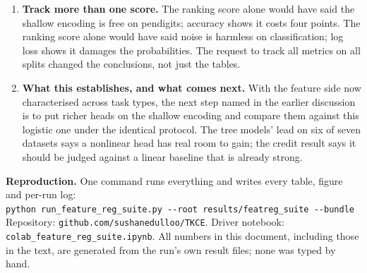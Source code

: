 \documentclass[11pt,a4paper]{article}
\begin{document}
\begin{enumerate}
\item \textbf{Track more than one score.} The ranking score alone would have
said the shallow encoding is free on pendigits; accuracy shows it costs four
points. The ranking score alone would have said noise is harmless on
classification; log loss shows it damages the probabilities. The request to
track all metrics on all splits changed the conclusions, not just the tables.

\item \textbf{What this establishes, and what comes next.} With the feature
side now characterised across task types, the next step named in the earlier
discussion is to put richer heads on the shallow encoding and compare them
against this logistic one under the identical protocol. The tree models' lead
on six of seven datasets says a nonlinear head has real room to gain; the
credit result says it should be judged against a linear baseline that is
already strong.

\end{enumerate}

\vfill
\begin{flushleft}\footnotesize
\textbf{Reproduction.} One command runs everything and writes every table,
figure and per-run log:\\
\texttt{python run\_feature\_reg\_suite.py -{}-root results/featreg\_suite -{}-bundle}\\[2pt]
Repository: \texttt{github.com/sushanedulloo/TKCE}. Driver notebook:
\texttt{colab\_feature\_reg\_suite.ipynb}. All numbers in this document,
including those in the text, are generated from the run's own result files;
none was typed by hand.
\end{flushleft}
\end{document}
